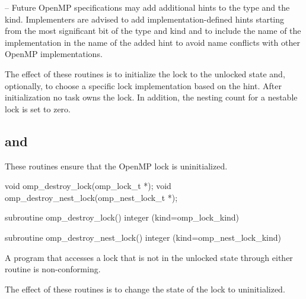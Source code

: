 \notestart
\noteheader – Future OpenMP specifications may add additional hints to the 
 type and the  kind.  
Implementers are advised to add implementation-defined hints starting from 
the most significant bit of the  type and
 kind and to include the name of the 
implementation in the name of the added hint to avoid name conflicts 
with other OpenMP implementations.
\noteend


\effect
The effect of these routines is to initialize the lock to the unlocked state and, optionally, to choose a specific lock implementation based on the hint. 
After initialization no task owns the lock. In addition, the nesting count for a nestable lock is set to zero.




\subsection[\code{omp\_destroy\_lock} and \code{omp\_destroy\_nest\_lock}]{ and\\ }
\label{subsec:omp_destroy_lock and omp_destroy_nest_lock}
\summary
These routines ensure that the OpenMP lock is uninitialized.

\format
\ccppspecificstart
\begin{boxedcode}
void omp\_destroy\_lock(omp\_lock\_t *);
void omp\_destroy\_nest\_lock(omp\_nest\_lock\_t *);
\end{boxedcode}
\ccppspecificend

\fortranspecificstart
\begin{boxedcode}
subroutine omp\_destroy\_lock()
integer (kind=omp\_lock\_kind) 

subroutine omp\_destroy\_nest\_lock()
integer (kind=omp\_nest\_lock\_kind) 
\end{boxedcode}
\fortranspecificend

\constraints
A program that accesses a lock that is not in the unlocked state through either routine is 
non-conforming.

\effect
The effect of these routines is to change the state of the lock to uninitialized.










